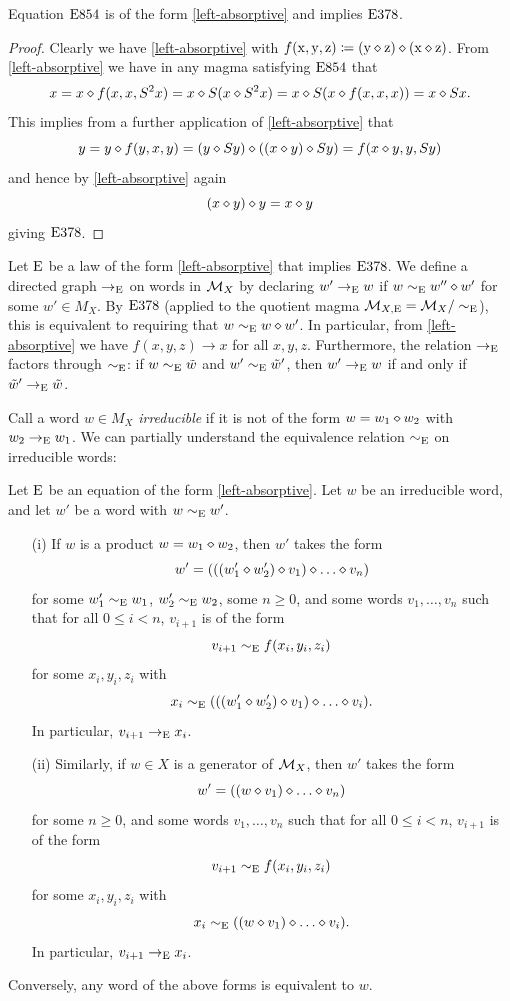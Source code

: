 \begin{lemma}\label{854} Equation $\mathrm{E}854$ is of the form \eqref{left-absorptive} and implies $\mathrm{E}378$.
\end{lemma}

\begin{proof}  Clearly we have \eqref{left-absorptive} with $f(\mathrm{x},\mathrm{y},\mathrm{z}) \coloneqq (\mathrm{y} \diamond \mathrm{z}) \diamond (\mathrm{x} \diamond \mathrm{z})$.  From \eqref{left-absorptive} we have in any magma satisfying $\mathrm{E}854$ that
$$x = x \diamond f(x,x,S^2 x) = x \diamond S(x \diamond S^2 x) = x \diamond S(x \diamond f(x,x,x)) = x \diamond Sx.$$
This implies from a further application of \eqref{left-absorptive} that
$$ y = y \diamond f(y,x,y) = (y \diamond Sy) \diamond ((x \diamond y) \diamond Sy) = f(x \diamond y, y, Sy)$$
and hence by \eqref{left-absorptive} again
$$ (x \diamond y) \diamond y = x \diamond y$$
giving $\mathrm{E}378$.
\end{proof}

Let $\mathrm{E}$ be a law of the form \eqref{left-absorptive} that implies $\mathrm{E}378$. We define a directed graph $\to_{\mathrm{E}}$ on words in ${\mathcal{M}}_X$ by declaring $w' \to_{\mathrm{E}} w$ if $w \sim_{\mathrm{E}} w'' \diamond w'$ for some $w' \in M_X$.  By $\mathrm{E}378$ (applied to the quotient magma ${\mathcal{M}}_{X,\mathrm{E}} = {\mathcal{M}}_X/\sim_{\mathrm{E}}$), this is equivalent to requiring that $w \sim_{\mathrm{E}} w \diamond w'$. In particular, from \eqref{left-absorptive} we have $f(x,y,z) \to x$ for all $x,y,z$.  Furthermore, the relation $\to_{\mathrm{E}}$ factors through $\sim_{\mathrm{E}}$: if $w \sim_{\mathrm{E}} \tilde w$ and $w' \sim_{\mathrm{E}} \tilde w'$, then $w' \to_{\mathrm{E}} w$ if and only if $\tilde w' \to_{\mathrm{E}} \tilde w$.

Call a word $w \in M_X$ \emph{irreducible} if it is not of the form $w = w_1 \diamond w_2$ with $w_2 \to_{\mathrm{E}} w_1$.  We can partially understand the equivalence relation $\sim_{\mathrm{E}}$ on irreducible words:

\begin{theorem}\label{irred-desc}  Let $\mathrm{E}$ be an equation of the form \eqref{left-absorptive}.  Let $w$ be an irreducible word, and let $w'$ be a word with $w \sim_{\mathrm{E}} w'$.
  \begin{itemize}
    \item[(i)] If $w$ is a product $w = w_1 \diamond w_2$, then $w'$ takes the form
$$ w' = (((w'_1 \op w'_2) \op v_1) \op \dots \op v_n)$$
for some $w'_1 \sim_{\mathrm{E}} w_1$, $w'_2 \sim_{\mathrm{E}} w_2$, some $n \geq 0$, and some words $v_1, \dots, v_n$ such that for all $0 \leq i < n$, $v_{i+1}$ is of the form
$$ v_{i+1} \sim_{\mathrm{E}} f(x_i,y_i,z_i)$$
for some $x_i, y_i, z_i$ with
$$ x_i \sim_\E (((w'_1 \op w'_2) \op v_1) \op \dots \op v_i).$$
In particular, $v_{i+1} \to_{\mathrm{E}} x_i$.
  \item[(ii)] Similarly, if $w \in X$ is a generator of ${\mathcal{M}}_X$, then $w'$ takes the form
$$ w' = ((w \op v_1) \op \dots \op v_n)$$
for some $n \geq 0$, and some words $v_1, \dots, v_n$ such that for all $0 \leq i < n$, $v_{i+1}$ is of the form
$$ v_{i+1} \sim_{\mathrm{E}} f(x_i,y_i,z_i)$$
for some $x_i, y_i, z_i$ with
$$ x_i \sim_\E ((w \op v_1) \op \dots \op v_i).$$
In particular, $v_{i+1} \to_{\mathrm{E}} x_i$.
\end{itemize}
Conversely, any word of the above forms is equivalent to $w$.
\end{theorem}

